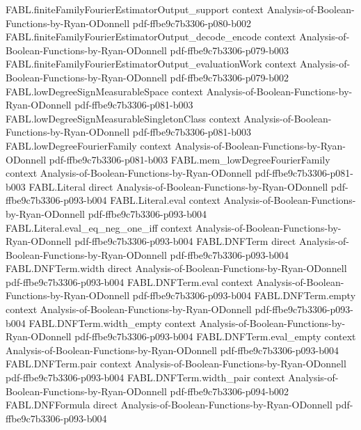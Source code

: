 \begin{theorem}
\proofstep
  {FABL.finiteFamilyFourierEstimatorOutput_support}
  {context}
  {Analysis-of-Boolean-Functions-by-Ryan-ODonnell}
  {pdf-ffbe9c7b3306-p080-b002}
\proofstep
  {FABL.finiteFamilyFourierEstimatorOutput_decode_encode}
  {context}
  {Analysis-of-Boolean-Functions-by-Ryan-ODonnell}
  {pdf-ffbe9c7b3306-p079-b003}
\proofstep
  {FABL.finiteFamilyFourierEstimatorOutput_evaluationWork}
  {context}
  {Analysis-of-Boolean-Functions-by-Ryan-ODonnell}
  {pdf-ffbe9c7b3306-p079-b002}
\proofstep
  {FABL.lowDegreeSignMeasurableSpace}
  {context}
  {Analysis-of-Boolean-Functions-by-Ryan-ODonnell}
  {pdf-ffbe9c7b3306-p081-b003}
\proofstep
  {FABL.lowDegreeSignMeasurableSingletonClass}
  {context}
  {Analysis-of-Boolean-Functions-by-Ryan-ODonnell}
  {pdf-ffbe9c7b3306-p081-b003}
\proofstep
  {FABL.lowDegreeFourierFamily}
  {context}
  {Analysis-of-Boolean-Functions-by-Ryan-ODonnell}
  {pdf-ffbe9c7b3306-p081-b003}
\proofstep
  {FABL.mem_lowDegreeFourierFamily}
  {context}
  {Analysis-of-Boolean-Functions-by-Ryan-ODonnell}
  {pdf-ffbe9c7b3306-p081-b003}
\proofstep
  {FABL.Literal}
  {direct}
  {Analysis-of-Boolean-Functions-by-Ryan-ODonnell}
  {pdf-ffbe9c7b3306-p093-b004}
\proofstep
  {FABL.Literal.eval}
  {context}
  {Analysis-of-Boolean-Functions-by-Ryan-ODonnell}
  {pdf-ffbe9c7b3306-p093-b004}
\proofstep
  {FABL.Literal.eval_eq_neg_one_iff}
  {context}
  {Analysis-of-Boolean-Functions-by-Ryan-ODonnell}
  {pdf-ffbe9c7b3306-p093-b004}
\proofstep
  {FABL.DNFTerm}
  {direct}
  {Analysis-of-Boolean-Functions-by-Ryan-ODonnell}
  {pdf-ffbe9c7b3306-p093-b004}
\proofstep
  {FABL.DNFTerm.width}
  {direct}
  {Analysis-of-Boolean-Functions-by-Ryan-ODonnell}
  {pdf-ffbe9c7b3306-p093-b004}
\proofstep
  {FABL.DNFTerm.eval}
  {context}
  {Analysis-of-Boolean-Functions-by-Ryan-ODonnell}
  {pdf-ffbe9c7b3306-p093-b004}
\proofstep
  {FABL.DNFTerm.empty}
  {context}
  {Analysis-of-Boolean-Functions-by-Ryan-ODonnell}
  {pdf-ffbe9c7b3306-p093-b004}
\proofstep
  {FABL.DNFTerm.width_empty}
  {context}
  {Analysis-of-Boolean-Functions-by-Ryan-ODonnell}
  {pdf-ffbe9c7b3306-p093-b004}
\proofstep
  {FABL.DNFTerm.eval_empty}
  {context}
  {Analysis-of-Boolean-Functions-by-Ryan-ODonnell}
  {pdf-ffbe9c7b3306-p093-b004}
\proofstep
  {FABL.DNFTerm.pair}
  {context}
  {Analysis-of-Boolean-Functions-by-Ryan-ODonnell}
  {pdf-ffbe9c7b3306-p093-b004}
\proofstep
  {FABL.DNFTerm.width_pair}
  {context}
  {Analysis-of-Boolean-Functions-by-Ryan-ODonnell}
  {pdf-ffbe9c7b3306-p094-b002}
\proofstep
  {FABL.DNFFormula}
  {direct}
  {Analysis-of-Boolean-Functions-by-Ryan-ODonnell}
  {pdf-ffbe9c7b3306-p093-b004}

\end{theorem}
